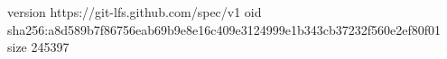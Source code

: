 version https://git-lfs.github.com/spec/v1
oid sha256:a8d589b7f86756eab69b9e8e16c409e3124999e1b343cb37232f560e2ef80f01
size 245397
